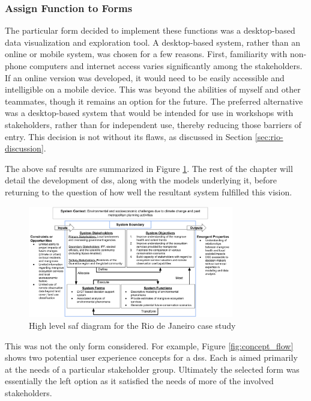\subsubsection{Assign Function to Forms}

The particular form decided to implement these functions was a desktop-based data visualization and exploration tool. A desktop-based system, rather than an online or mobile system, was chosen for a few reasons. First, familiarity with non-phone computers and internet access varies significantly among the stakeholders. If an online version was developed, it would need to be easily accessible and intelligible on a mobile device. This was beyond the abilities of myself and other teammates, though it remains an option for the future. The preferred alternative was a desktop-based system that would be intended for use in workshops with stakeholders, rather than for independent use, thereby reducing those barriers of entry. This decision is not without its flaws, as discussed in Section \ref{sec:rio-discussion}. 

The above \ac{saf} results are summarized in Figure \ref{fig:system-diagram-rio}. The rest of the chapter will detail the development of \ac{dss}, along with the models underlying it, before returning to the question of how well the resultant system fulfilled this vision.

\begin{figure}[!htb] 
\centering
\includegraphics[width=0.8\textwidth]{Figures/chap4/system-diagram-rio.png}
\caption[High level SAF diagram for the Rio de Janeiro case study]{High level \ac{saf} diagram for the Rio de Janeiro case study}
\label{fig:system-diagram-rio}
\end{figure}

This was not the only form considered. For example, Figure \ref{fig:concept_flow} shows two potential user experience concepts for a \ac{dss}. Each is aimed primarily at the needs of a particular stakeholder group. Ultimately the selected form was essentially the left option as it satisfied the needs of more of the involved stakeholders. 

